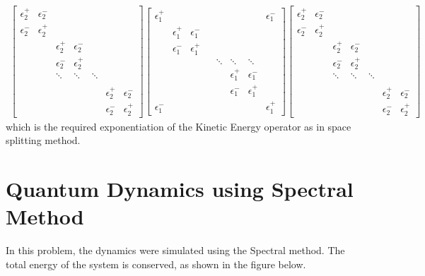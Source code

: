 \documentclass[11pt, oneside]{article}   	%
\begin{document}
\begin{align}
\left[
\begin{array}{ccccccccc}
\epsilon_2^+ & \epsilon_2^- & & & & & \\
\epsilon_2^- & \epsilon_2^+ &  \\
  &  & \epsilon_2^+ & \epsilon_2^- \\
    &  & \epsilon_2^- & \epsilon_2^+ \\
  &  & \ddots & \ddots & \ddots \\
 & &  &  &  &  \\
 & &  &  &  & \epsilon_2^+ & \epsilon_2^- \\
 & &  &  &   & \epsilon_2^- & \epsilon_2^+
\end{array}\right]
\left[
\begin{array}{ccccccccc}
\epsilon_1^+ & & & & & & & \epsilon_1^- \\
& \epsilon_1^+ & \epsilon_1^- \\
& \epsilon_1^- & \epsilon_1^+ &  \\
 & & & & \ddots & \ddots & \ddots \\
& & &  &    & \epsilon_1^+ & \epsilon_1^- \\
& & &  &     & \epsilon_1^- & \epsilon_1^+ \\
\epsilon_1^- & & &  &  &   &   & \epsilon_1^+
\end{array}\right] 
\left[
\begin{array}{ccccccccc}
\epsilon_2^+ & \epsilon_2^- & & & & & \\
\epsilon_2^- & \epsilon_2^+ &  \\
  &  & \epsilon_2^+ & \epsilon_2^- \\
    &  & \epsilon_2^- & \epsilon_2^+ \\
  &  & \ddots & \ddots & \ddots \\
 & &  &  &  &  \\
 & &  &  &  & \epsilon_2^+ & \epsilon_2^- \\
 & &  &  &   & \epsilon_2^- & \epsilon_2^+
\end{array}\right]
\end{align}
which is the required exponentiation of the Kinetic Energy operator as in space splitting method.
\pagebreak

\section{Quantum Dynamics using Spectral Method}
In this problem, the dynamics were simulated using the Spectral method. The total energy of the system is conserved, as shown in the figure below.
\end{document}
